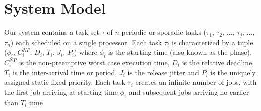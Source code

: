 \section{System Model}\label{sec:system_model}

Our system contains a task set \begin{math}\tau\end{math} of $n$ periodic or sporadic tasks (\begin{math}\tau_{1}\end{math}, \begin{math}\tau_{2}\end{math}, ..., \begin{math}\tau_{j}\end{math}, ..., \begin{math}\tau_{n}\end{math}) each scheduled on a single processor.  Each task \begin{math}\tau_{i}\end{math} is characterized by a tuple (\begin{math}\phi_{i}\end{math}, \begin{math}C_{i}^{NP}\end{math}, \begin{math}D_{i}\end{math}, \begin{math}T_{i}\end{math}, \begin{math}J_{i}\end{math}, \begin{math}P_{i}\end{math}) where \begin{math}\phi_{i}\end{math} is the starting time (also known as the phase), \begin{math}C_{i}^{NP}\end{math} is the non-preemptive worst case execution time, \begin{math}D_{i}\end{math} is the relative deadline, \begin{math}T_{i}\end{math} is the inter-arrival time or period, \begin{math}J_{i}\end{math} is the release jitter and \begin{math}P_{i}\end{math} is the uniquely assigned static fixed priority.  Each task \begin{math}\tau_{i}\end{math} creates an infinite number of jobs, with the first job arriving at starting time \begin{math}\phi_{i}\end{math} and subsequent jobs arriving no earlier than \begin{math}T_{i}\end{math} time 